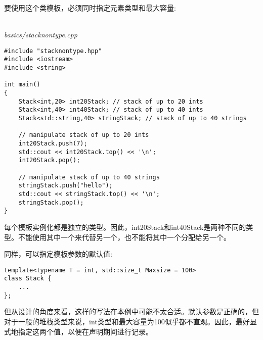 要使用这个类模板，必须同时指定元素类型和最大容量:

\hspace*{\fill} \\ %
\noindent
\textit{basics/stacknontype.cpp}
\begin{lstlisting}[style=styleCXX]
#include "stacknontype.hpp"
#include <iostream>
#include <string>

int main()
{
	Stack<int,20> int20Stack; // stack of up to 20 ints
	Stack<int,40> int40Stack; // stack of up to 40 ints
	Stack<std::string,40> stringStack; // stack of up to 40 strings
	
	// manipulate stack of up to 20 ints
	int20Stack.push(7);
	std::cout << int20Stack.top() << '\n';
	int20Stack.pop();
	
	// manipulate stack of up to 40 strings
	stringStack.push("hello");
	std::cout << stringStack.top() << '\n';
	stringStack.pop();
}
\end{lstlisting}

每个模板实例化都是独立的类型。因此，int20Stack和int40Stack是两种不同的类型。不能使用其中一个来代替另一个，也不能将其中一个分配给另一个。

同样，可以指定模板参数的默认值:

\begin{lstlisting}[style=styleCXX]
template<typename T = int, std::size_t Maxsize = 100>
class Stack {
	...
};
\end{lstlisting}

但从设计的角度来看，这样的写法在本例中可能不太合适。默认参数是正确的，但对于一般的堆栈类型来说，int类型和最大容量为100似乎都不直观。因此，最好显式地指定这两个值，以便在声明期间进行记录。






























